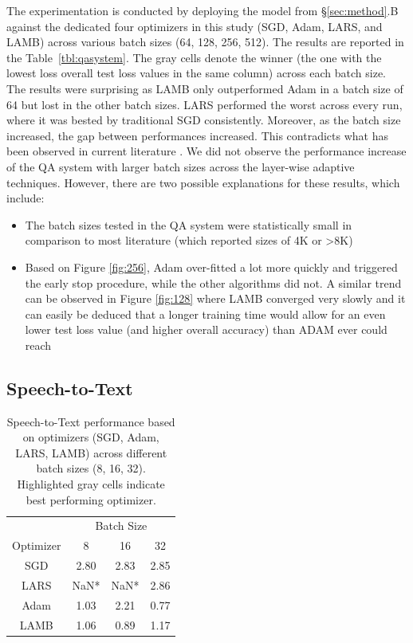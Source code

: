The experimentation is conducted by deploying the model from \S\ref{sec:method}.B against the dedicated four optimizers in this study (SGD, Adam, LARS, and LAMB) across various batch sizes (64, 128, 256, 512). The results are reported in the Table~\ref{tbl:qasystem}. The gray cells denote the winner (the one with the lowest loss overall test loss values in the same column) across each batch size. The results were surprising as LAMB only outperformed Adam in a batch size of 64 but lost in the other batch sizes. LARS performed the worst across every run, where it was bested by traditional SGD consistently. Moreover, as the batch size increased, the gap between performances increased. This contradicts what has been observed in current literature \cite{ginsburg2018large}. We did not observe the performance increase of the QA system with larger batch sizes across the layer-wise adaptive techniques. However, there are two possible explanations for these results, which include: 
\begin{itemize}
    \item The batch sizes tested in the QA system were statistically small in comparison to most literature (which reported sizes of 4K or >8K)
    \item Based on Figure \ref{fig:256}, Adam over-fitted a lot more quickly and triggered the early stop procedure, while the other algorithms did not. A similar trend can be observed in Figure \ref{fig:128} where LAMB converged very slowly and it can easily be deduced that a longer training time would allow for an even lower test loss value (and higher overall accuracy) than ADAM ever could reach
\end{itemize}

\subsection{Speech-to-Text}
\begin{table}[!t]
\vspace{-5pt}
\small
\vspace{7pt}
\caption{Speech-to-Text performance based on optimizers (SGD, Adam, LARS, LAMB) across different batch sizes (8, 16, 32). Highlighted gray cells indicate best performing optimizer.}\label{tbl:speech_results}
\vspace{-10pt}
\begin{center}
\begin{tabular}{ c|c|c|c}
 &  \multicolumn{3}{c}{Batch Size}\\ 
\cline{2-4}
\multicolumn{1}{c|}{Optimizer} &
 \multicolumn{1}{c|}{8} &
 \multicolumn{1}{c|}{16} &
 \multicolumn{1}{c}{32}  \\
\hline
SGD & 2.80 & 2.83 & 2.85 \\
LARS & NaN* & NaN* & 2.86 \\
Adam & \cellcolor{gray!30} 1.03 & 2.21 & \cellcolor{gray!30}  0.77 \\
LAMB & 1.06 & \cellcolor{gray!30} 0.89 & 1.17 \\
\end{tabular}
\end{center}
\vspace{-15pt}
\end{table}